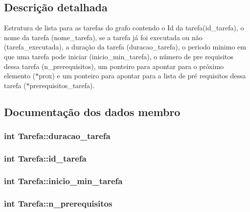 \subsection{Descrição detalhada}
Estrutura de lista para as tarefas do grafo contendo o Id da tarefa(id\-\_\-tarefa), o nome da tarefa (nome\-\_\-tarefa), se a tarefa já foi executada ou não (tarefa\-\_\-executada), a duração da tarefa (duracao\-\_\-tarefa), o periodo minimo em que uma tarefa pode iniciar (inicio\-\_\-min\-\_\-tarefa), o número de pre requisitos dessa tarefa (n\-\_\-prerequisitos), um ponteiro para apontar para o próximo elemento ($\ast$prox) e um ponteiro para apontar para a lista de pré requisitos dessa tarefa ($\ast$prerequisitos\-\_\-tarefa). 

\subsection{Documentação dos dados membro}
\hypertarget{structTarefa_a7962bef326f487f4ffa7dc0f04153729}{
\subsubsection[{duracao\-\_\-tarefa}]{\setlength{\rightskip}{0pt plus 5cm}int Tarefa\-::duracao\-\_\-tarefa}}\label{structTarefa_a7962bef326f487f4ffa7dc0f04153729}
\hypertarget{structTarefa_a1509b75b75f758e2d0502df4162366f2}{
\subsubsection[{id\-\_\-tarefa}]{\setlength{\rightskip}{0pt plus 5cm}int Tarefa\-::id\-\_\-tarefa}}\label{structTarefa_a1509b75b75f758e2d0502df4162366f2}
\hypertarget{structTarefa_a7d09c30d0162c55a0aab1ad71716fae6}{
\subsubsection[{inicio\-\_\-min\-\_\-tarefa}]{\setlength{\rightskip}{0pt plus 5cm}int Tarefa\-::inicio\-\_\-min\-\_\-tarefa}}\label{structTarefa_a7d09c30d0162c55a0aab1ad71716fae6}
\hypertarget{structTarefa_a9f6369cef91f4b9d544d9e1be0bc705f}{
\subsubsection[{n\-\_\-prerequisitos}]{\setlength{\rightskip}{0pt plus 5cm}int Tarefa\-::n\-\_\-prerequisitos}}\label{structTarefa_a9f6369cef91f4b9d544d9e1be0bc705f}
